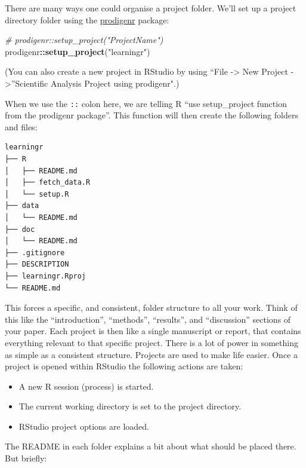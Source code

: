 \documentclass[]{Nemilov}
\newenvironment{Shaded}{\begin{snugshade}}{\end{snugshade}}
\newcommand{\CommentTok}[1]{\textcolor[rgb]{0.56,0.35,0.01}{\textit{#1}}}
\newcommand{\KeywordTok}[1]{\textcolor[rgb]{0.13,0.29,0.53}{\textbf{#1}}}
\newcommand{\NormalTok}[1]{#1}
\newcommand{\OperatorTok}[1]{\textcolor[rgb]{0.81,0.36,0.00}{\textbf{#1}}}
\newcommand{\StringTok}[1]{\textcolor[rgb]{0.31,0.60,0.02}{#1}}
\providecommand{\tightlist}{%
  \setlength{\itemsep}{0pt}\setlength{\parskip}{0pt}}
\begin{document}
There are many ways one could organise a project folder. We'll set up a project
directory folder using the
\href{http://prodigenr.lukewjohnston.com}{prodigenr} package:

\begin{Shaded}
\begin{Highlighting}[]
\CommentTok{# prodigenr::setup_project("ProjectName")}
\NormalTok{prodigenr}\OperatorTok{::}\KeywordTok{setup_project}\NormalTok{(}\StringTok{"learningr"}\NormalTok{)}
\end{Highlighting}
\end{Shaded}

(You can also create a new project in RStudio by using ``File -\textgreater{} New Project -\textgreater{}''Scientific Analysis Project using prodigenr".)

When we use the \texttt{::} colon here, we are telling R ``use setup\_project function from the prodigenr package''. This function will then create the following
folders and files:

\begin{verbatim}
learningr
├── R
│   ├── README.md
│   ├── fetch_data.R
│   └── setup.R
├── data
│   └── README.md
├── doc
│   └── README.md
├── .gitignore
├── DESCRIPTION
├── learningr.Rproj
└── README.md
\end{verbatim}

This forces a specific, and consistent, folder structure to all your work. Think
of this like the ``introduction'', ``methods'', ``results'', and ``discussion'' sections
of your paper. Each project is then like a single manuscript or report, that
contains everything relevant to that specific project. There is a lot of
power in something as simple as a consistent structure. Projects are used to
make life easier. Once a project is opened within RStudio the following actions
are taken:

\begin{itemize}
\tightlist
\item
  A new R session (process) is started.
\item
  The current working directory is set to the project directory.
\item
  RStudio project options are loaded.
\end{itemize}

The README in each folder explains a bit about what should be placed there. But
briefly:
\end{document}
